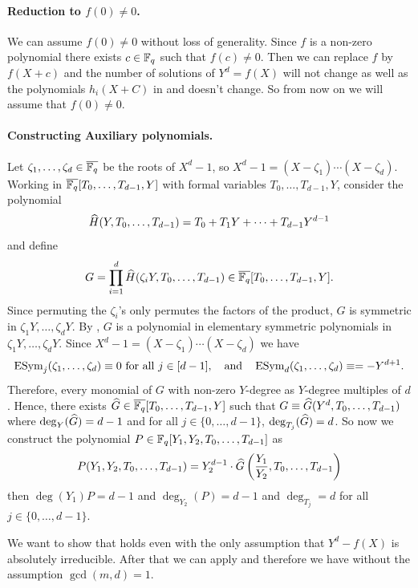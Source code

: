
\paragraph*{Reduction to $f(0)\neq 0$.} We can assume $f(0)\neq 0$ without loss of generality. Since $f$ is a non-zero polynomial there exists $c\in\mathbb{F}_q$ such that $f(c)\neq 0$. Then we can replace $f$ by $f(X+c)$ and the number of solutions of $Y^d=f(X)$ will not change as well as the polynomials $h_i(X+C)$ in \StepanovLinIndeplem and \StepanovQExistslem doesn't change. So from now on we will assume that $f(0)\neq 0$.

\paragraph*{Constructing Auxiliary polynomials.} Let $\zeta_1,\dots, \zeta_d\in\overline{\mathbb{F}_q}$ be the roots of $X^d-1$, so $X^d-1=(X-\zeta_1)\cdots (X-\zeta_d)$. Working in $\overline{\mathbb{F}_q}[T_0,\dots,T_{d-1},Y]$ with formal variables $T_0,\dots,T_{d-1},Y$, consider the polynomial $$\widehat{H}(Y,T_0,\dots, T_{d-1})=T_0+T_1 Y+\cdots+T_{d-1}Y^{d-1}$$ and define $$G=\prod_{i=1}^d \widehat{H}(\zeta_iY,T_0,\dots, T_{d-1})\in\overline{\mathbb{F}_q}[T_0,\dots,T_{d-1},Y].$$ Since permuting the $\zeta_i$'s only permutes the factors of the product, $G$ is symmetric in $\zeta_1Y,\dots,\zeta_dY$. By \ElmSymmetrySpansthm, $G$ is a polynomial in elementary symmetric polynomials in $\zeta_1Y,\dots, \zeta_dY$. 
Since $X^d-1=(X-\zeta_1)\cdots (X-\zeta_d)$ we have $$\operatorname{ESym}_j(\zeta_1,\dots,\zeta_d)\equiv 0\text{ for all } j\in[d-1],\quad\text{and}\quad \operatorname{ESym}_d(\zeta_1,\dots,\zeta_d)\equiv =-Y^{d+1}.$$ Therefore, every monomial of $G$ with non-zero $Y$-degree as $Y$-degree multiples of $d$. Hence, there exists $\widehat{G}\in\overline{\mathbb{F}_q}[T_0,\dots,T_{d-1},Y]$ such that $G\equiv \widehat{G}(Y^d,T_0,\dots,T_{d-1})$ where $\deg_Y(\widehat{G})=d-1$ and for all $j\in\{0,\dots,d-1\}$, $\deg_{T_j}(\widehat{G})=d$. So now we construct the polynomial $P\in\mathbb{F}_q[Y_1,Y_2,T_0,\dots, T_{d-1}]$ as $$P(Y_1,Y_2,T_0,\dots, T_{d-1})=Y_2^{d-1}\cdot \widehat{G}\left(\frac{Y_1}{Y_2},T_0,\dots, T_{d-1}\right)$$then $\deg(Y_1)P=d-1$ and $\deg_{Y_2}(P)=d-1$ and $\deg_{T_j}=d$ for all $j\in\{0,\dots, d-1\}$. 

\begin{want}
We want to show that \StepanovLinIndeplem holds even with the only assumption that  $Y^d-f(X)$ is absolutely irreducible. After that we can apply \StepanovQExistslem and therefore we have \StepanovRestrictedthm without the assumption $\gcd(m,d)=1$.
\end{want}

